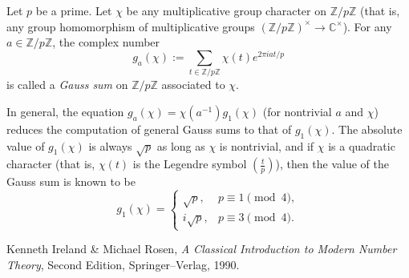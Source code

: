 \documentclass[12pt]{article}
\newcommand{\Z}{\mathbb{Z}}
\newcommand{\C}{\mathbb{C}}
\begin{document}
Let $p$ be a prime. Let $\chi$ be any multiplicative group character on $\Z/p\Z$ (that is, any group homomorphism of multiplicative groups $(\Z/p\Z)^\times \to \C^\times$). For any $a \in \Z/p\Z$, the complex number
$$
g_a(\chi) := \sum_{t \in \Z/p\Z} \chi(t) e^{2 \pi i a t/p}
$$
is called a {\em Gauss sum} on $\Z/p\Z$ associated to $\chi$.

In general, the equation $g_a(\chi) = \chi(a^{-1}) g_1(\chi)$ (for nontrivial $a$ and $\chi$) reduces the computation of general Gauss sums to that of $g_1(\chi)$. The absolute value of $g_1(\chi)$ is always $\sqrt{p}$ as long as $\chi$ is nontrivial, and if $\chi$ is a quadratic character (that is, $\chi(t)$ is the Legendre symbol $\left(\frac{t}{p}\right)$), then the value of the Gauss sum is known to be
$$
g_1(\chi) =
\begin{cases}
\sqrt{p}, & p \equiv 1 \pmod{4}, \\
i \sqrt{p}, & p \equiv 3 \pmod{4}.
\end{cases}
$$
\begin{thebibliography}{9}
 Kenneth Ireland \& Michael Rosen, {\em A Classical Introduction to Modern Number Theory}, Second Edition, Springer--Verlag, 1990.
\end{thebibliography}
\end{document}
